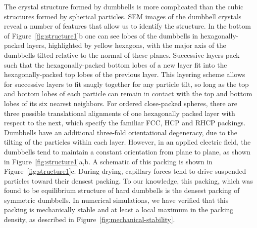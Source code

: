  The crystal structure formed by dumbbells is more complicated than the cubic structures formed by spherical particles.
 SEM images of the dumbbell crystals reveal a number of features that allow us to identify the structure.
 In the bottom of Figure~\ref{fig:structure1}b one can see lobes of the dumbbells in hexagonally-packed layers, highlighted by yellow hexagons, with the major axis of the dumbbells tilted relative to the normal of these planes.
 Successive layers pack such that the hexagonally-packed bottom lobes of a new layer fit into the hexagonally-packed top lobes of the previous layer.
 This layering scheme allows for successive layers to fit snugly together for any particle tilt, so long as the top and bottom lobes of each particle can remain in contact with the top and bottom lobes of its six nearest neighbors.
 For ordered close-packed spheres, there are three possible translational alignments of one hexagonally packed layer with respect to the next, which specify the familiar FCC, HCP and RHCP packings.
 Dumbbells have an additional three-fold orientational degeneracy, due to the tilting of the particles within each layer.
 However, in an applied electric field, the dumbbells tend to maintain a constant orientation from plane to plane, as shown in Figure~\ref{fig:structure1}a,b.
 A schematic of this packing is shown in Figure~\ref{fig:structure1}c.
During drying, capillary forces tend to drive suspended particles toward their densest packing.
 To our knowledge, this packing, which was found to be equilibrium structure of hard dumbbells \cite{Vega1992} is the densest packing of symmetric dumbbells.
 In numerical simulations, we have verified that this packing is mechanically stable and at least a local maximum in the packing density, as described in Figure~\ref{fig:mechanical-stability}.

